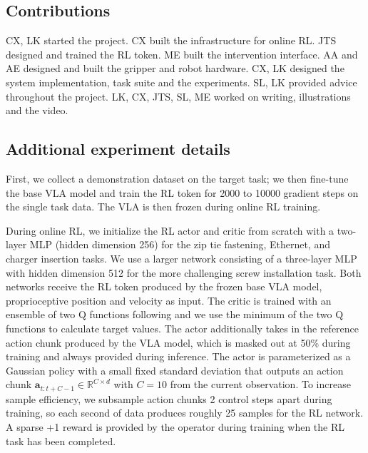 
\appendix

\subsection{Contributions}

CX, LK started the project. CX built the infrastructure for online RL. JTS designed and trained the RL token. ME built the intervention interface. AA and AE designed and built the gripper and robot hardware. CX, LK designed the system implementation, task suite and the experiments. SL, LK provided advice throughout the project. LK, CX, JTS, SL, ME worked on writing, illustrations and the video. 

\subsection{Additional experiment details}
\label{app:exp}


First, we collect a demonstration dataset on the target task; we then fine-tune the base VLA model and train the RL token for 2000 to 10000 gradient steps on the single task data. The VLA is then frozen during online RL training.

During online RL, we initialize the RL actor and critic from scratch with a two-layer MLP (hidden dimension 256) for the zip tie fastening, Ethernet, and charger insertion tasks. We use a larger network consisting of a three-layer MLP with hidden dimension 512 for the more challenging screw installation task. Both networks receive the RL token produced by the frozen base VLA model, proprioceptive position and velocity as input. The critic is trained with an ensemble of two Q functions following \citet{fujimoto2018td3} and we use the minimum of the two Q functions to calculate target values. The actor additionally takes in the reference action chunk produced by the VLA model, which is masked out at 50\% during training and always provided during inference. The actor is parameterized as a Gaussian policy with a small fixed standard deviation that outputs an action chunk $\mathbf{a}_{t:t+C-1} \in \mathbb{R}^{C \times d}$ with $C{=}10$ from the current observation. To increase sample efficiency, we subsample action chunks 2 control steps apart during training, so each second of data produces roughly 25 samples for the RL network. A sparse +1 reward is provided by the operator during training when the RL task has been completed. 

